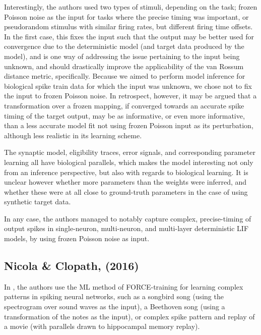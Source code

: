 \documentclass[mphil,deptreport,ianc]{infthesis} %
\begin{document}
Interestingly, the authors used two types of stimuli, depending on the task; frozen Poisson noise as the input for tasks where the precise timing was important, or pseudorandom stimulus with similar firing rates, but different firing time offsets.
In the first case, this fixes the input such that the output may be better used for convergence due to the deterministic model (and target data produced by the model), and is one way of addressing the issue pertaining to the input being unknown, and should drastically improve the applicability of the van Rossum distance metric, specifically.
Because we aimed to perform model inference for biological spike train data for which the input was unknown, we chose not to fix the input to frozen Poisson noise. 
In retrospect, however, it may be argued that a transformation over a frozen mapping, if converged towards an accurate spike timing of the target output, may be as informative, or even more informative, than a less accurate model fit not using frozen Poisson input as its perturbation, although less realistic in its learning scheme.

The synaptic model, eligibility traces, error signals, and corresponding parameter learning all have biological parallels, which makes the model interesting not only from an inference perspective, but also with regards to biological learning.
It is unclear however whether more parameters than the weights were inferred, and whether these were at all close to ground-truth parameters in the case of using synthetic target data.

In any case, the authors managed to notably capture complex, precise-timing of output spikes in single-neuron, multi-neuron, and multi-layer deterministic LIF models, by using frozen Poisson noise as input.


\subsection{Nicola \& Clopath, (2016)}

In \cite{Nicola2016}, the authors use the ML method of FORCE-training for learning complex patterns in spiking neural networks, such as a songbird song (using the spectrogram over sound waves as the input), a Beethoven song (using a transformation of the notes as the input), or complex spike pattern and replay of a movie (with parallels drawn to hippocampal memory replay).
\end{document}

